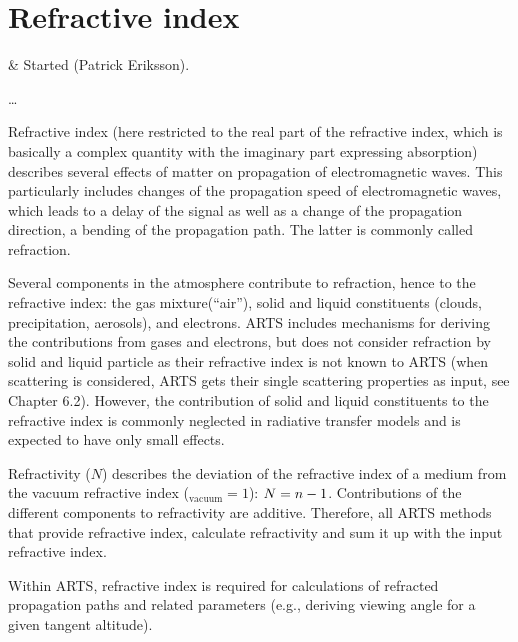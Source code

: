 \chapter{Refractive index}
 \label{sec:rindex}

 & Started (Patrick Eriksson).\\
\stophistory

 \dots

Refractive index (here restricted to the real part of the refractive index, which is basically a complex quantity with the imaginary part expressing absorption) describes several effects of matter on propagation of electromagnetic waves. This particularly includes changes of the propagation speed of electromagnetic waves, which leads to a delay of the signal as well as a change of the propagation direction, a bending of the propagation path. The latter is commonly called refraction.

Several components in the atmosphere contribute to refraction, hence to the refractive index: the gas mixture(``air''), solid and liquid constituents (clouds, precipitation, aerosols), and electrons. ARTS includes mechanisms for deriving the contributions from gases and electrons, but does not consider refraction by solid and liquid particle as their refractive index is not known to ARTS (when scattering is considered, ARTS gets their single scattering properties as input, see Chapter 6.2). However, the contribution of solid and liquid constituents to the refractive index is commonly neglected in radiative transfer models and is expected to have only small effects.

Refractivity ($N$) describes the deviation of the refractive index of a medium \Rfr  from the vacuum refractive index (\Rfr$_\mathrm{vacuum}=1$): $N=n-1$. Contributions of the different components to refractivity are additive. Therefore, all ARTS methods that provide refractive index, calculate refractivity and sum it up with the input refractive index.

Within ARTS, refractive index is required for calculations of refracted propagation paths and related parameters (e.g., deriving viewing angle for a given tangent altitude). 


